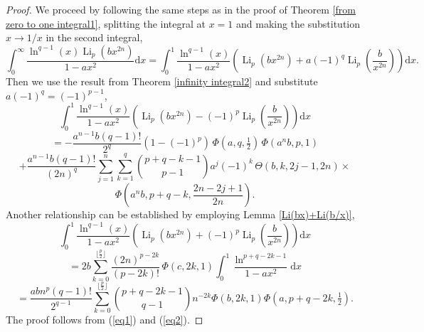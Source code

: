 \documentclass[11pt,reqno]{article}
\begin{document}
\begin{proof} 
	We proceed by following the same steps as in the proof of Theorem \ref{from zero to one integral1}, splitting the integral at $x=1$ and making the substitution $x\to 1/x$ in the second integral,
	\[\int_0^\infty\frac{\ln^{q-1}(x)\operatorname{Li}_p(bx^{2n})}{1-ax^2}\mathrm{d} x=\int_0^1\frac{\ln^{q-1}(x)}{1-ax^2}\left(\operatorname{Li}_p(bx^{2n})+a{(-1)}^{q}\operatorname{Li}_p\left(\frac{b}{x^{2n}}\right)\right)\mathrm{d} x.\]
	Then we use the result from Theorem \ref{infinity integral2} and substitute $a{(-1)}^{q}={(-1)}^{p-1}$,
	\[\int_0^1\frac{\ln^{q-1}(x)}{1-ax^2}\left(\operatorname{Li}_p(bx^{2n})-{(-1)}^{p}\operatorname{Li}_p\left(\frac{b}{x^{2n}}\right)\right)\mathrm{d} x\]
	\[=-\frac{a^{n-1}b(q-1)!}{2^{q}}(1-{(-1)}^{p})\,\Phi(a,q,\tfrac12)\,\Phi(a^nb,p,1)\]
	\[+\frac{a^{n-1}b (q-1)!}{{(2n)}^{q}}\sum_{j=1}^{n}\sum_{k=1}^{q}\binom{p+q-k-1}{p-1}a^j{(-1)}^{k}\,\Theta(b,k,2j-1,2n)\times\]
	\begin{equation}
		\Phi\left(a^nb,p+q-k,\frac{2n-2j+1}{2n}\right).\label{eq1}
	\end{equation}	
	Another relationship can be established by employing Lemma \ref{Li(bx)+Li(b/x)},
	\[\int_0^1\frac{\ln^{q-1}(x)}{1-ax^2}\left(\operatorname{Li}_p(bx^{2n})+{(-1)}^{p}\operatorname{Li}_p\left(\frac{b}{x^{2n}}\right)\right)\mathrm{d} x\]
	\[=2b\sum_{k=0}^{\lfloor{\frac{p}{2}}\rfloor} \frac{{(2n)}^{p-2k}}{(p-2k)!}\,\Phi(c,2k,1)\int_0^1\frac{\ln^{p+q-2k-1}}{1-ax^2}\mathrm{d} x\]
	\begin{equation}
		=\frac{ab n^{p}(q-1)!}{2^{q-1}}\sum_{k=0}^{\lfloor\frac{p}{2}\rfloor}\binom{p+q-2k-1}{q-1}n^{-2k}\Phi(b,2k,1)\Phi(a,p+q-2k,\tfrac{1}{2}).\label{eq2}
	\end{equation}
	The proof follows from (\ref{eq1}) and (\ref{eq2}).
\end{proof}
\end{document}
